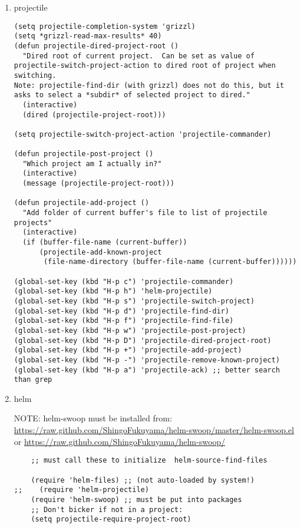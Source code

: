 \documentclass{article}
\begin{document}
\begin{enumerate}
\item projectile
\label{sec-1-11-9-1}

\begin{verbatim}
(setq projectile-completion-system 'grizzl)
(setq *grizzl-read-max-results* 40)
(defun projectile-dired-project-root ()
  "Dired root of current project.  Can be set as value of
projectile-switch-project-action to dired root of project when switching.
Note: projectile-find-dir (with grizzl) does not do this, but it
asks to select a *subdir* of selected project to dired."
  (interactive)
  (dired (projectile-project-root)))

(setq projectile-switch-project-action 'projectile-commander)

(defun projectile-post-project ()
  "Which project am I actually in?"
  (interactive)
  (message (projectile-project-root)))

(defun projectile-add-project ()
  "Add folder of current buffer's file to list of projectile projects"
  (interactive)
  (if (buffer-file-name (current-buffer))
      (projectile-add-known-project
       (file-name-directory (buffer-file-name (current-buffer))))))

(global-set-key (kbd "H-p c") 'projectile-commander)
(global-set-key (kbd "H-p h") 'helm-projectile)
(global-set-key (kbd "H-p s") 'projectile-switch-project)
(global-set-key (kbd "H-p d") 'projectile-find-dir)
(global-set-key (kbd "H-p f") 'projectile-find-file)
(global-set-key (kbd "H-p w") 'projectile-post-project)
(global-set-key (kbd "H-p D") 'projectile-dired-project-root)
(global-set-key (kbd "H-p +") 'projectile-add-project)
(global-set-key (kbd "H-p -") 'projectile-remove-known-project)
(global-set-key (kbd "H-p a") 'projectile-ack) ;; better search than grep
\end{verbatim}

\item helm
\label{sec-1-11-9-2}

NOTE: helm-swoop must be installed from:
\url{https://raw.github.com/ShingoFukuyama/helm-swoop/master/helm-swoop.el}
or
\url{https://raw.github.com/ShingoFukuyama/helm-swoop/}
\begin{verbatim}
    ;; must call these to initialize  helm-source-find-files

    (require 'helm-files) ;; (not auto-loaded by system!)
;;    (require 'helm-projectile)
    (require 'helm-swoop) ;; must be put into packages
    ;; Don't bicker if not in a project:
    (setq projectile-require-project-root)


\end{verbatim}
\end{enumerate}
\end{document}

